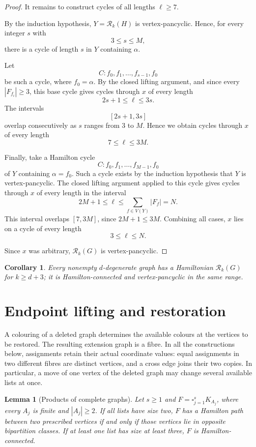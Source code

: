 \documentclass[11pt]{article}
\newtheorem{lemma}[theorem]{Lemma}
\newtheorem{corollary}[theorem]{Corollary}
\theoremstyle{remark}
\newcommand{\Rk}{\mathcal R_k}
\numberwithin{equation}{section}
\begin{document}
\begin{proof}
It remains to construct cycles of all lengths $\ell\ge 7$.

By the induction hypothesis, $Y=\Rk(H)$ is vertex-pancyclic.
Hence, for every integer $s$ with
\[
3\le s\le M,
\]
there is a cycle of length $s$ in $Y$ containing $\alpha$.

Let
\[
C:f_0,f_1,\ldots,f_{s-1},f_0
\]
be such a cycle, where $f_0=\alpha$.
By the closed lifting argument, and since every $|F_{f_i}|\ge 3$, this
base cycle gives cycles through $x$ of every length
\[
2s+1\le \ell\le 3s.
\]
The intervals
\[
[2s+1,3s]
\]
overlap consecutively as $s$ ranges from $3$ to $M$. Hence we obtain
cycles through $x$ of every length
\[
7\le \ell\le 3M.
\]

Finally, take a Hamilton cycle
\[
C:f_0,f_1,\ldots,f_{M-1},f_0
\]
of $Y$ containing $\alpha=f_0$.
Such a cycle exists by the induction hypothesis that $Y$ is
vertex-pancyclic.
The closed lifting argument applied to this cycle gives cycles through
$x$ of every length in the interval
\[
2M+1\le \ell\le \sum_{f\in V(Y)}|F_f|=N.
\]
This interval overlaps $[7,3M]$, since $2M+1\le 3M$.
Combining all cases, $x$ lies on a cycle of every length
\[
3\le \ell\le N.
\]

Since $x$ was arbitrary, $\Rk(G)$ is vertex-pancyclic.
\end{proof}


\begin{corollary}
\label{cor:degenerate-hamiltonian}
Every nonempty $d$-degenerate graph has a Hamiltonian $\Rk(G)$ for $k\ge d+3$; it is Hamilton-connected and vertex-pancyclic in the same range.
\end{corollary}


\section{Endpoint lifting and restoration}
\label{sec:restoration}

A colouring of a deleted graph determines the available colours at the
vertices to be restored.  The resulting extension graph is a fibre.  In
all the constructions below, assignments retain their actual coordinate
values: equal assignments in two different fibres are distinct vertices,
and a cross edge joins their two copies.  In particular, a move of one
vertex of the deleted graph may change several available lists at once.

\begin{lemma}[Products of complete graphs]
\label{lem:product}
Let $s\ge1$ and $F=\square_{j=1}^s K_{A_j}$, where every $A_j$ is
finite and $|A_j|\ge2$.  If all lists have size two, $F$ has a
Hamilton path between two prescribed vertices if and only if those
vertices lie in opposite bipartition classes.  If at least one list has
size at least three, $F$ is Hamilton-connected.
\end{lemma}
\end{document}
